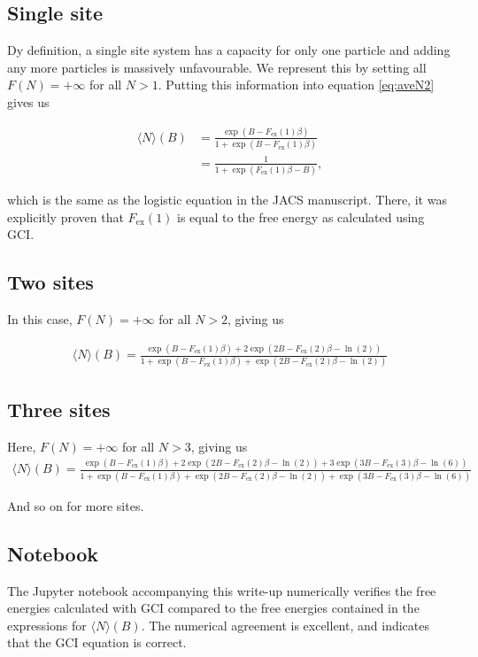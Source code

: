 \documentclass[10pt,a4paper]{article}
\begin{document}
\subsection{Single site}
Dy definition, a single site system has a capacity for only one particle and adding any more particles is massively unfavourable. We represent this by setting all $F(N)=+\infty$ for all $N>1$. Putting this information into equation \ref{eq:aveN2} gives us

\begin{align*}
\langle N \rangle(B) &= \frac{\exp(B - F_\text{ex}(1)\beta)}{1 + \exp(B - F_\text{ex}(1)\beta)} \\
&= \frac{1}{1 + \exp(F_\text{ex}(1)\beta - B)},
\end{align*}

which is the same as the logistic equation in the JACS manuscript. There, it was explicitly proven that $F_\text{ex}(1)$ is equal to the free energy as calculated using GCI.

\subsection{Two sites}
In this case, $F(N) = +\infty$ for all $N>2$, giving us

\begin{align*}
\langle N \rangle(B) = \frac{\exp(B - F_\text{ex}(1)\beta) + 2\exp(2B - F_\text{ex}(2)\beta - \ln(2))}{1 + \exp(B - F_\text{ex}(1)\beta) + \exp(2B - F_\text{ex}(2)\beta - \ln(2))}
\end{align*}

\subsection{Three sites}
Here, $F(N) = +\infty$ for all $N>3$, giving us
\begin{align*}
\langle N \rangle(B) = \frac{\exp(B - F_\text{ex}(1)\beta) + 2\exp(2B - F_\text{ex}(2)\beta - \ln(2)) + 3\exp(3B - F_\text{ex}(3)\beta - \ln(6))}{1 + \exp(B - F_\text{ex}(1)\beta) + \exp(2B - F_\text{ex}(2)\beta - \ln(2)) + \exp(3B - F_\text{ex}(3)\beta - \ln(6))}
\end{align*}

And so on for more sites.

\subsection{Notebook}
The Jupyter notebook accompanying this write-up  numerically verifies the free energies calculated with GCI compared to the free energies contained in the expressions for $\langle N \rangle(B)$. The numerical agreement is excellent, and indicates that the GCI equation is correct.
\end{document}
